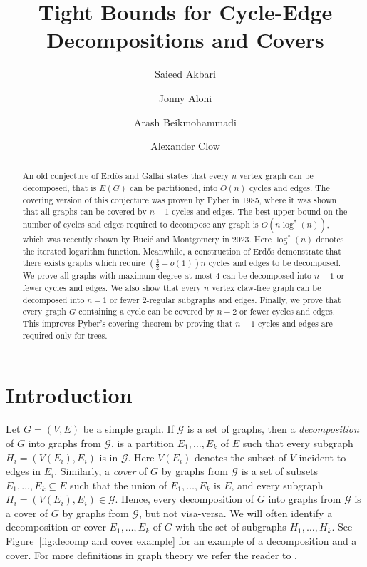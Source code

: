 \documentclass[11pt]{amsart}
\title{Tight Bounds for Cycle-Edge Decompositions and Covers}
\author{Saieed Akbari}
\author{Jonny Aloni}
\author{Arash Beikmohammadi}
\author{Alexander Clow}
\date{}
\theoremstyle{definition}
\begin{document}

\begin{abstract}
    An old conjecture of Erd{\H{o}}s and Gallai states that  every $n$ vertex graph can be decomposed,
    that is $E(G)$ can be partitioned,
    into $O(n)$ cycles and edges.
    The covering version of this conjecture was proven by Pyber in 1985, where it was shown that all graphs can be covered by $n-1$ cycles and edges.
    The best upper bound on the number of cycles and edges required to decompose any graph is $O(n\log^*(n))$,
    which was recently shown by
    Buci{\'c} and Montgomery in 2023.
    Here $\log^*(n)$ denotes the iterated logarithm function.
    Meanwhile, a construction of Erd{\H{o}}s
    demonstrate that there exists graphs which require $(\frac{3}{2}-o(1))n$
    cycles and edges to be decomposed.
    We prove all graphs with maximum degree at most $4$ can be decomposed into
    $n-1$ or fewer cycles and edges.
    We also show that every $n$ vertex claw-free graph can be decomposed into $n-1$ or fewer $2$-regular subgraphs and edges.
    Finally, we prove that every graph $G$ containing a cycle can be covered by $n-2$ or fewer cycles and edges.
    This improves Pyber's covering theorem by proving that $n-1$ cycles and edges are required only for trees.
\end{abstract}

\maketitle


\section{Introduction}


Let $G = (V,E)$ be a simple graph.
If $\mathcal{G}$ is a set of graphs, then a \emph{decomposition} of $G$ into graphs from $\mathcal{G}$, is a partition $E_1,\dots, E_k$ of $E$
such that every subgraph $H_i = (V(E_i),E_i)$ is in $ \mathcal{G}$.
Here $V(E_i)$ denotes the subset of $V$ incident to edges in $E_i$.
Similarly, a \emph{cover} of $G$ by graphs from $\mathcal{G}$ is a set of subsets $E_1,\dots, E_k \subseteq E$ such that
the union of $E_1,\dots, E_k$ is $E$, and every subgraph $H_i = (V(E_i),E_i) \in \mathcal{G}$.
Hence, every decomposition of $G$ into graphs from $\mathcal{G}$ is a cover of $G$ by graphs from $\mathcal{G}$, but not visa-versa.
We will often identify a decomposition or cover $E_1,\dots, E_k$ of $G$ with the set of subgraphs $H_1,\dots, H_k$.
See Figure~\ref{fig:decomp and cover example} for an example of a decomposition and a cover.
For more definitions in graph theory we refer the reader to \cite{west2001introduction}.
\end{document}
